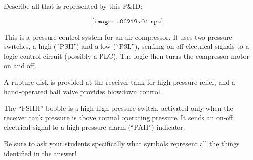 

Describe all that is represented by this P\&ID:

$$\texttt{[image: i00219x01.eps]}$$







This is a pressure control system for an air compressor.  It uses two pressure switches, a high (``PSH'') and a low (``PSL''), sending on-off electrical signals to a logic control circuit (possibly a PLC).  The logic then turns the compressor motor on and off.

A rupture disk is provided at the receiver tank for high pressure relief, and a hand-operated ball valve provides blowdown control.

The ``PSHH'' bubble is a high-high pressure switch, activated only when the receiver tank pressure is above normal operating pressure.  It sends an on-off electrical signal to a high pressure alarm (``PAH'') indicator.







Be sure to ask your students specifically what symbols represent all the things identified in the answer!




